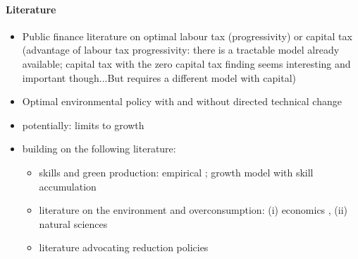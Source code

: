 \paragraph{Literature}
\begin{itemize}
\item Public finance literature on optimal labour tax (progressivity) or capital tax (advantage of labour tax progressivity: there is a tractable model already available; capital tax with the zero capital tax finding seems interesting and important though...But requires a different model with capital) \citep{Heathcote2017OptimalFramework, Conesa2009TaxingAll, Domeij2004OnTaxes}
\item Optimal environmental policy with and without directed technical change \citep{Acemoglu2012TheChange, Acemoglu2016TransitionTechnology, Fried2018ClimateAnalysis, Barrage2019OptimalPolicy, Golosov2014OptimalEquilibrium, Hassler2016EnvironmentalMacroeconomics}
\item potentially: limits to growth \citep{Stokey1998AreGrowth, Jones2016LifeGrowth, Arrow2004AreMuch}
\item building on the following literature: \begin{itemize}
\item skills and green production: empirical \citep{Consoli2016DoCapital, Bowen2018CharacterisingComposition, Borissov2019CarbonDevelopment}; growth model with skill accumulation \citep{Borissov2019CarbonDevelopment}
\item literature on the environment and overconsumption: (i) economics \citep{Dasgupta2021, Brock2005ChapterEmpirics, Arrow2004AreMuch, Cohen2019AnnualSubstitutable}, (ii) natural sciences \citep{ Rockstrom2009AHumanity, Rogelj2018MitigationDevelopment.}
\item literature advocating reduction policies \citep{Schor2005SustainableReduction, Pullinger2014WorkingDesign}

\end{itemize}
\end{itemize}

\section{}\label{sec:rm}

